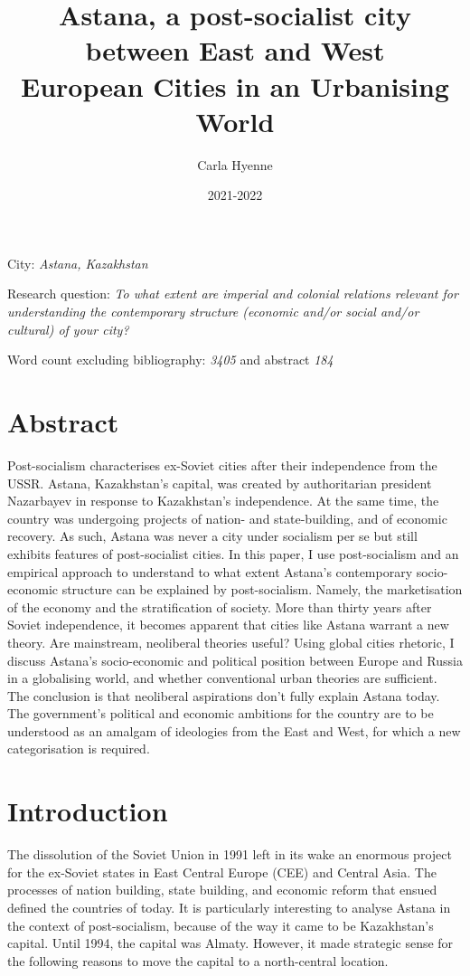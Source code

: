 \documentclass{article}
\title{Astana, a post-socialist city between East and West 
\\[4ex] \large European Cities in an Urbanising World}
\author{Carla Hyenne}
\date{2021-2022}
\begin{document}
\singlespacing 
\maketitle 
\thispagestyle{empty}


City: \textit{Astana, Kazakhstan}

Research question: \textit{To what extent are imperial and colonial relations relevant for understanding the contemporary structure (economic and/or social and/or cultural) of your city?}

Word count excluding bibliography: \textit{3405} and abstract \textit{184} 

\section{Abstract}
\doublespacing
Post-socialism characterises ex-Soviet cities after their independence from the USSR.
Astana, Kazakhstan's capital, was created by authoritarian president Nazarbayev in response to Kazakhstan's independence. At the same time, the country was undergoing projects of nation- and state-building, and of economic recovery. As such, Astana was never a city under socialism per se but still exhibits features of post-socialist cities. In this paper, I use post-socialism and an empirical approach to understand to what extent Astana's contemporary socio-economic structure can be explained by post-socialism. 
Namely, the marketisation of the economy and the stratification of society.
More than thirty years after Soviet independence, it becomes apparent that cities like Astana warrant a new theory. 
Are mainstream, neoliberal theories useful? Using global cities rhetoric, I discuss Astana's socio-economic and political position between Europe and Russia in a globalising world, and whether conventional urban theories are sufficient. 
The conclusion is that neoliberal aspirations don't fully explain Astana today. The government's political and economic ambitions for the country are to be understood as an amalgam of ideologies from the East and West, for which a new categorisation is required.


\pagebreak
\setcounter{page}{1}
\doublespacing

\section{Introduction} 

The dissolution of the Soviet Union in 1991 left in its wake an enormous project for the ex-Soviet states in East Central Europe (CEE) and Central Asia. The processes of nation building, state building, and economic reform that ensued defined the countries of today. It is particularly interesting to analyse Astana in the context of post-socialism, because of the way it came to be Kazakhstan's capital. 
Until 1994, the capital was Almaty. However, it made strategic sense for the following reasons to move the capital to a north-central location. 
\end{document}
